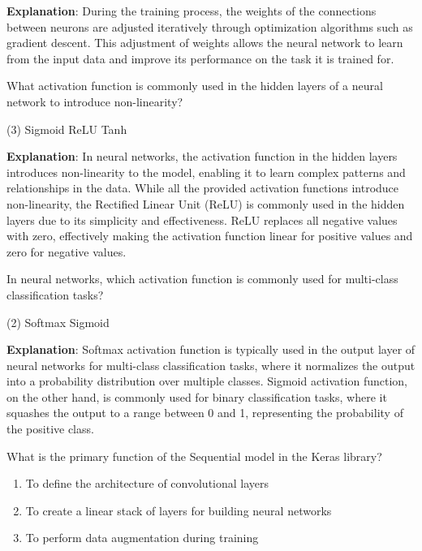 \begin{answer}
\textbf{Explanation}: During the training process, the weights of the connections between neurons are adjusted iteratively through optimization algorithms such as gradient descent. This adjustment of weights allows the neural network to learn from the input data and improve its performance on the task it is trained for.
\end{answer}

\begin{question}
What activation function is commonly used in the hidden layers of a neural network to introduce non-linearity?
\begin{tasks}(3)
\task Sigmoid
\task ReLU
\task Tanh
\end{tasks}
\end{question}

\begin{answer}
\textbf{Explanation}: In neural networks, the activation function in the hidden layers introduces non-linearity to the model, enabling it to learn complex patterns and relationships in the data. While all the provided activation functions introduce non-linearity, the Rectified Linear Unit (ReLU) is commonly used in the hidden layers due to its simplicity and effectiveness. ReLU replaces all negative values with zero, effectively making the activation function linear for positive values and zero for negative values.
\end{answer}

\begin{question}
In neural networks, which activation function is commonly used for multi-class classification tasks?
\begin{tasks}(2)
\task Softmax
\task Sigmoid
\end{tasks}
\end{question}

\begin{answer}
\textbf{Explanation}: Softmax activation function is typically used in the output layer of neural networks for multi-class classification tasks, where it normalizes the output into a probability distribution over multiple classes. Sigmoid activation function, on the other hand, is commonly used for binary classification tasks, where it squashes the output to a range between 0 and 1, representing the probability of the positive class.
\end{answer}

\begin{question}
What is the primary function of the Sequential model in the Keras library?
\begin{enumerate}[a]
\item To define the architecture of convolutional layers
\item To create a linear stack of layers for building neural networks
\item To perform data augmentation during training
\end{enumerate}
\end{question}

